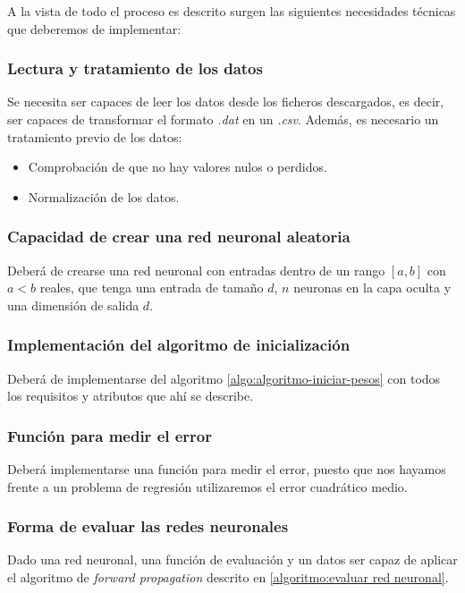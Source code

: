 A la vista de todo el proceso es descrito surgen las siguientes necesidades técnicas que deberemos de implementar:  

\subsubsection{Lectura y tratamiento de los datos}

Se necesita ser capaces de leer los datos desde los ficheros descargados, es decir, ser capaces de transformar el formato \textit{.dat} en un \textit{.csv}. 
Además, es necesario un tratamiento previo de los datos: 
\begin{itemize}
    \item Comprobación de que no hay valores nulos o perdidos. 
    \item Normalización de los datos. 
\end{itemize}


\subsubsection{Capacidad de crear una red neuronal aleatoria}  

Deberá de crearse una red neuronal con entradas dentro de un rango $[a,b]$ con $a < b$ reales,
que tenga una entrada de tamaño $d$,
$n$ neuronas en la capa oculta y
una dimensión de salida $d$.

\subsubsection{Implementación del algoritmo de inicialización}

Deberá de implementarse del algoritmo  \ref{algo:algoritmo-iniciar-pesos} con todos los requisitos y atributos que ahí se describe.  

\subsubsection{Función para medir el error}

Deberá implementarse una función para medir el
 error, puesto que nos hayamos frente a un problema de regresión utilizaremos el error cuadrático medio. 

\subsubsection{Forma de evaluar las redes neuronales}  

Dado una red neuronal, una función de evaluación y un datos ser capaz de aplicar el algoritmo de \textit{forward propagation} descrito en \ref{algoritmo:evaluar red neuronal}.

